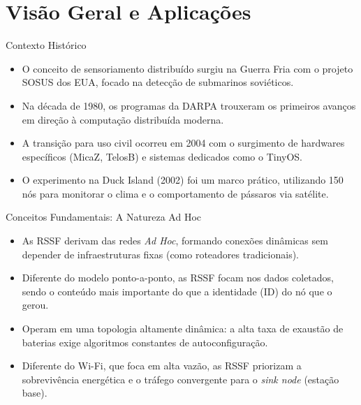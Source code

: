 \section{Visão Geral e Aplicações}


\begin{frame}{Contexto Histórico}
    \begin{itemize}
        \item O conceito de sensoriamento distribuído surgiu na Guerra Fria com o projeto SOSUS dos EUA, focado na detecção de submarinos soviéticos. 
        \item Na década de 1980, os programas da DARPA trouxeram os primeiros avanços em direção à computação distribuída moderna. 
        \item A transição para uso civil ocorreu em 2004 com o surgimento de hardwares específicos (MicaZ, TelosB) e sistemas dedicados como o TinyOS. 
        \item O experimento na Duck Island (2002) foi um marco prático, utilizando 150 nós para monitorar o clima e o comportamento de pássaros via satélite. 
    \end{itemize}
\end{frame}

\begin{frame}{Conceitos Fundamentais: A Natureza Ad Hoc}
    \begin{itemize}
        \item As RSSF derivam das redes \textit{Ad Hoc}, formando conexões dinâmicas sem depender de infraestruturas fixas (como roteadores tradicionais). 
        \item Diferente do modelo ponto-a-ponto, as RSSF focam nos dados coletados, sendo o conteúdo mais importante do que a identidade (ID) do nó que o gerou. 
        \item Operam em uma topologia altamente dinâmica: a alta taxa de exaustão de baterias exige algoritmos constantes de autoconfiguração. 
        \item Diferente do Wi-Fi, que foca em alta vazão, as RSSF priorizam a sobrevivência energética e o tráfego convergente para o \textit{sink node} (estação base). 
    \end{itemize}
\end{frame}

